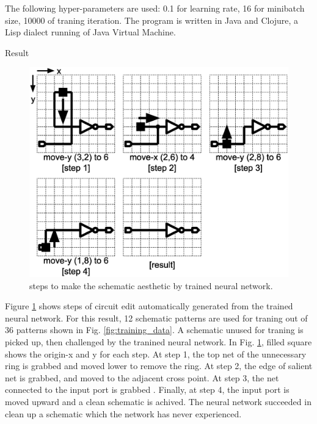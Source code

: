 \documentclass[twocolumn]{article}
\makeatletter
\def\section{\@startsection {section}{1}{\z@}{20pt plus 2pt minus 2pt}
{8pt plus 2pt minus 2pt}{\centering\normalsize\sc
\edef\@svsec{\thesection.\ }}}
\def\thesection{\Roman{section}}
\makeatother
\begin{document}
The following hyper-parameters are used:
0.1 for learning rate, 16 for minibatch size, 10000 of traning iteration.
The program is written in Java and Clojure,
a Lisp dialect running of Java Virtual Machine.


\section{Result}

\begin{figure}[!tp]
 \begin{center}
  \begin{minipage}{\hsize}
   \includegraphics[width=\hsize]{fig/edit_steps_03.eps}
   \caption{steps to make the schematic aesthetic by trained neural network.}
   \label{fig:edit_steps}
  \end{minipage}
 \end{center}
\end{figure}

Figure \ref{fig:edit_steps} shows steps of circuit edit
automatically generated from the trained neural network.
For this result, 12 schematic patterns are used for traning
out of 36 patterns shown in Fig. \ref{fig:training_data}.
A schematic unused for traning is picked up,
then challenged by the tranined neural network.
In Fig. \ref{fig:edit_steps}, filled square shows the origin-x and y
for each step.
At step 1, the top net of the unnecessary ring is grabbed and moved lower
to remove the ring.
At step 2, the edge of salient net is grabbed,
and moved to the adjacent cross point.
At step 3, the net connected to the input port is grabbed .
Finally, at step 4, the input port is moved upward
and a clean schematic is achived.
The neural network succeeded in clean up a schematic
which the network has never experienced.
\end{document}
